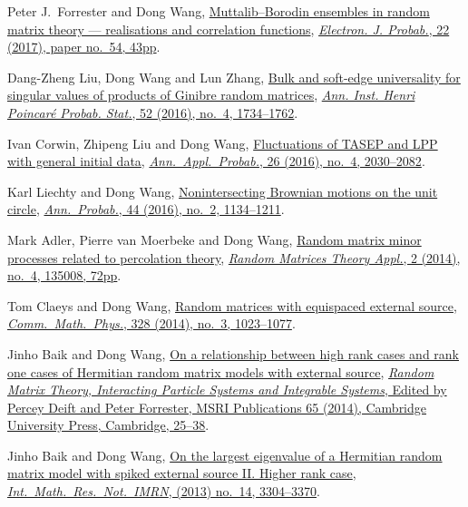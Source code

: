 \documentclass[12pt,a4paper]{article}
\begin{document}
\begin{etaremune}
\item
  Peter J.~Forrester and Dong Wang, \href{http://arxiv.org/abs/1502.07147}{Muttalib--Borodin ensembles in random matrix theory --- realisations and correlation functions}, \href{https://doi.org/10.1214/17-EJP62}{\textit{Electron. J. Probab.}, 22 (2017), paper no.\ 54, 43pp}.
\item
  Dang-Zheng Liu, Dong Wang and Lun Zhang, \href{http://arxiv.org/abs/1412.6777}{Bulk and soft-edge universality for singular values of products of Ginibre random matrices}, \href{https://doi.org/10.1214/15-AIHP696}{\textit{Ann. Inst. Henri Poincar\'e Probab. Stat.}, 52 (2016), no.\ 4, 1734--1762}.
\item
  Ivan Corwin, Zhipeng Liu and Dong Wang, \href{http://arxiv.org/abs/1412.5087}{Fluctuations of TASEP and LPP with general initial data}, \href{https://doi.org/10.1214/15-AAP1139}{\textit{Ann.\ Appl.\ Probab.}, 26 (2016), no.\ 4, 2030--2082}.
\item
  Karl Liechty and Dong Wang, \href{http://arxiv.org/abs/1312.7390}{Nonintersecting Brownian motions on the unit circle}, \href{https://doi.org/10.1214/14-AOP998}{\textit{Ann.\ Probab.}, 44 (2016), no.\ 2, 1134--1211}.
\item 
  Mark Adler, Pierre van Moerbeke and Dong Wang,
  \href{http://arxiv.org/abs/1301.7017}{Random matrix minor processes related to percolation theory}, \href{https://doi.org/10.1142/S2010326313500081}{\textit{Random Matrices Theory Appl.}, 2 (2014), no.\ 4, 135008, 72pp}.
\item 
  Tom Claeys and Dong Wang,
  \href{http://arxiv.org/abs/1212.3768}{Random matrices with equispaced external source}, \href{https://doi.org/10.1007/s00220-014-1988-y}{\textit{Comm.\ Math.\ Phys.}, 328 (2014), no.\ 3, 1023--1077}.
\item Jinho Baik and Dong Wang,
  \href{http://arxiv.org/abs/1207.0389}{On a relationship between high rank cases and rank one cases of Hermitian random matrix models with external source}, \href{http://www.cambridge.org/asia/catalogue/catalogue.asp?isbn=9781107079922}{\textit{Random Matrix Theory, Interacting Particle Systems and Integrable Systems}, Edited by Percey Deift and Peter Forrester, MSRI Publications 65 (2014), Cambridge University Press, Cambridge, 25--38}.
\item Jinho Baik and Dong Wang,
  \href{http://arxiv.org/abs/1104.2915}{On the largest eigenvalue of a Hermitian random matrix model with spiked external source II. Higher rank case}, \href{https://doi.org/10.1093/imrn/rns136}{\textit{Int.\ Math.\ Res.\ Not.\ IMRN}, (2013) no.\ 14, 3304--3370}.

\end{etaremune}
\end{document}

